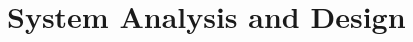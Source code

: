 \documentclass{llncs2e/llncs}
\begin{document}
%

%
%
%

\section{System Analysis and Design}

\end{document}
